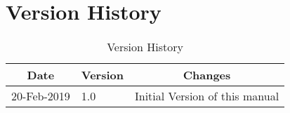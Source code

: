 \newpage
\thispagestyle{plain}
\section*{Version History}
\begin{table}[H]
\centering
	\begin{tabular}{| p{3cm} | p{2cm} | p{10cm} |}
	\multicolumn{1}{c}{\textbf{Date}} & \multicolumn{1}{c}{\textbf{Version}} & \multicolumn{1}{c}{\textbf{Changes}}\\
	\hline
	20-Feb-2019 & 1.0 & Initial Version of this manual \\
	\hline
	\end{tabular}
	\caption{Version History}
	\label{tab:version history}
\end{table}
\clearpage


\thispagestyle{plain}
\tableofcontents

